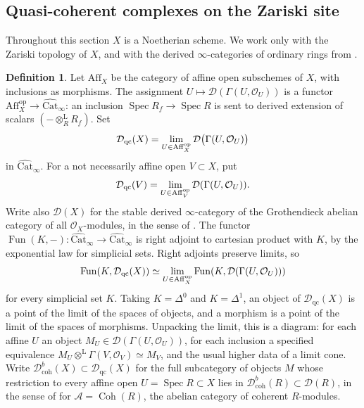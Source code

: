 \documentclass[11pt]{amsart}
\newcommand{\cA}{\mathcal{A}}
\newcommand{\cO}{\mathcal{O}}
\newcommand{\cD}{\mathcal{D}}
\newcommand{\op}{{\operatorname{op}}}
\renewcommand{\lim}{\operatornamewithlimits{\rm{lim}}}
\newcommand{\Coh}{\operatorname{{Coh}}}
\newcommand{\Spec}{\operatorname{Spec}}
\newcommand{\Aff}{\mathrm{Aff}}
\DeclareMathOperator{\Fun}{\mathrm{Fun}}
\newcommand{\Catbig}{\widehat{\mathrm{Cat}}}
\newcommand{\Dqc}{\mathcal D_{\mathrm{qc}}}
\newcommand{\Dbc}{\mathcal D^b_{\mathrm{coh}}}
\theoremstyle{plain}
\theoremstyle{definition}
\newtheorem{definition}[definition]{Definition}
\numberwithin{equation}{section}
\begin{document}
\subsection{Quasi-coherent complexes on the Zariski site}
Throughout this section $X$ is a Noetherian scheme.
We work only with the Zariski topology of $X$, and with the derived $\infty$-categories of ordinary rings from \cite[Definition 1.3.5.8; Theorem 7.1.2.13]{HA}.

\begin{definition}\label{def:dqc}
Let $\Aff_X$ be the category of affine open subschemes of $X$, with inclusions as morphisms.
The assignment $U\mapsto\cD(\Gamma(U,\cO_U))$ is a functor $\Aff_X^{\op}\to\Catbig_\infty$: an inclusion $\Spec R_f\to\Spec R$ is sent to derived extension of scalars $(-\otimes_R^{\mathrm L}R_f)$.
Set
\[
 \Dqc(X)=\lim_{U\in\Aff_X^{\op}}\cD\bigl(\Gamma(U,\cO_U)\bigr)
\]
in $\Catbig_\infty$.
For a not necessarily affine open $V\subset X$, put
\[
 \Dqc(V)=\lim_{U\in\Aff_V^{\op}}\cD(\Gamma(U,\cO_U)).
\]
Write also $\cD(X)$ for the stable derived $\infty$-category of the Grothendieck abelian category of all $\cO_X$-modules, in the sense of .
The functor $\Fun(K,-):\Catbig_\infty\to\Catbig_\infty$ is right adjoint to cartesian product with $K$, by the exponential law for simplicial sets.
Right adjoints preserve limits, so
$$\Fun(K,\Dqc(X))\simeq\lim_{U\in\Aff_X^{\op}}\Fun(K,\cD(\Gamma(U,\cO_U)))$$
for every simplicial set $K$.
Taking $K=\Delta^0$ and $K=\Delta^1$, an object of $\Dqc(X)$ is a point of the limit of the spaces of objects, and a morphism is a point of the limit of the spaces of morphisms.
Unpacking the limit, this is a diagram: for each affine $U$ an object $M_U\in\cD(\Gamma(U,\cO_U))$, for each inclusion a specified equivalence $M_U\otimes^{\mathrm L}\Gamma(V,\cO_V)\simeq M_V$, and the usual higher data of a limit cone.
Write $\Dbc(X)\subset\Dqc(X)$ for the full subcategory of objects $M$ whose restriction to every affine open $U=\Spec R\subset X$ lies in $\mathcal D^b_{\mathrm{coh}}(R)\subset\cD(R)$, in the sense of  for $\cA=\Coh(R)$, the abelian category of coherent $R$-modules.
\end{definition}
\end{document}
